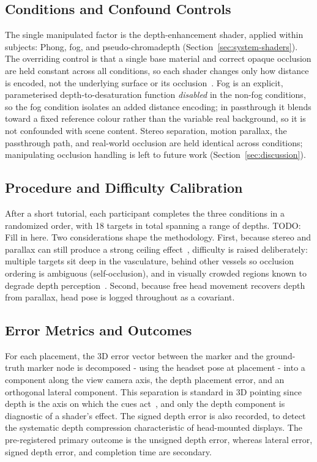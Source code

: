 \documentclass[runningheads]{llncs}
\begin{document}
\subsection{Conditions and Confound Controls}\label{sec:design-conditions}
The single manipulated factor is the depth-enhancement shader, applied within subjects: Phong, fog, and pseudo-chromadepth (Section~\ref{sec:system-shaders}). The overriding control is that a single base material and correct opaque occlusion are held constant across all conditions, so each shader changes only how distance is encoded, not the underlying surface or its occlusion~\cite{kersten-oertel_evaluation_2014,titov_effect_2021}. Fog is an explicit, parameterised depth-to-desaturation function \emph{disabled} in the non-fog conditions, so the fog condition isolates an added distance encoding; in passthrough it blends toward a fixed reference colour rather than the variable real background, so it is not confounded with scene content. Stereo separation, motion parallax, the passthrough path, and real-world occlusion are held identical across conditions; manipulating occlusion handling is left to future work (Section~\ref{sec:discussion}).

\subsection{Procedure and Difficulty Calibration}\label{sec:design-procedure}
After a short tutorial, each participant completes the three conditions in a randomized order, with 18 targets in total spanning a range of depths. TODO: Fill in here. Two considerations shape the methodology.
First, because stereo and parallax can still produce a strong ceiling effect~\cite{heinrich_estimating_2021,titov_effect_2021}, difficulty is raised deliberately: multiple targets sit deep in the vasculature, behind other vessels so occlusion ordering is ambiguous (self-occlusion), and in visually crowded regions known to degrade depth perception~\cite{lesar_evaluation_2024}. Second, because free head movement recovers depth from parallax, head pose is logged throughout as a covariant.

\subsection{Error Metrics and Outcomes}\label{sec:design-metrics} For each placement, the 3D error vector between the marker and the ground-truth marker node is decomposed - using the headset pose at placement - into a component along the view camera axis, the depth placement error, and an orthogonal lateral component. This separation is standard in 3D pointing since depth is the axis on which the cues act~\cite{teather_pointing_2011,batmaz_effect_2022}, and only the depth component is diagnostic of a shader's effect. The signed depth error is also recorded, to detect the systematic depth compression characteristic of head-mounted displays. The pre-registered primary outcome is the unsigned depth error, whereas lateral error, signed depth error, and completion time are secondary.
\end{document}
